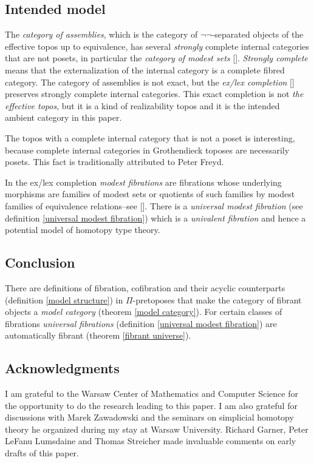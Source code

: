 \documentclass{tac}
\newcommand\citep[1]{[\cite{#1}]}
\begin{document}
\subsection*{Intended model} The \emph{category of assemblies}, which is the category of $\neg\neg$-separated objects of the effective topos up to equivalence, has several \emph{strongly} complete internal categories that are not posets, in particular the \emph{category of modest sets} \citep{MR1097022,MR2479466,MR1023803}. \emph{Strongly complete} means that the externalization of the internal category is a complete fibred category. The category of assemblies is not exact, but the \emph{ex/lex completion} \citep{MR1600009} preserves strongly complete internal categories. This exact completion is not \emph{the effective topos}, but it is a kind of realizability topos and it is the intended ambient category in this paper. 

The topos with a complete internal category that is not a poset is interesting, because complete internal categories in Grothendieck toposes are necessarily posets. This fact is traditionally attributed to Peter Freyd.

In the ex/lex completion \emph{modest fibrations} are fibrations whose underlying morphisms are families of modest sets or quotients of such families by modest families of equivalence relations--see \citep{MR1097022,MR1023803,MR2479466}. There is a \emph{universal modest fibration} (see definition \ref{universal modest fibration}) which is a \emph{univalent fibration} and hence a potential model of homotopy type theory.

\subsection*{Conclusion} There are definitions of fibration, cofibration and their acyclic counterparts (definition \ref{model structure}) in $\Pi$-pretoposes that make the category of fibrant objects a \emph{model category} (theorem \ref{model category}). For certain classes of fibrations \emph{universal fibrations} (definition \ref{universal modest fibration}) are automatically fibrant (theorem \ref{fibrant universe}).

\subsection*{Acknowledgments} 
I am grateful to the Warsaw Center of Mathematics and Computer Science for the opportunity to do the research leading to this paper. I am also grateful for discussions with Marek Zawadowski and the seminars on simplicial homotopy theory he organized during my stay at Warsaw University. Richard Garner, Peter LeFanu Lumsdaine and Thomas Streicher made invaluable comments on early drafts of this paper.
\end{document}
